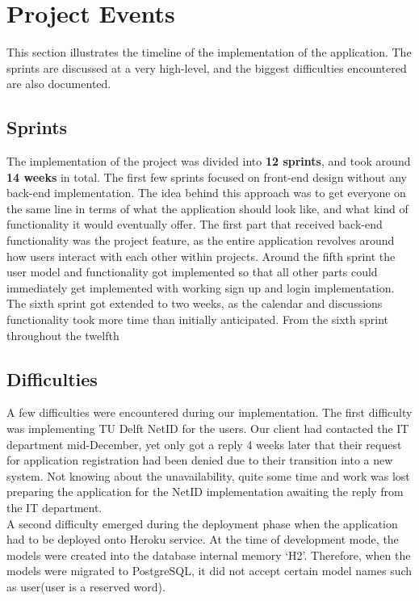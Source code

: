 \section{Project Events}

This section illustrates the timeline of the implementation of the application. The sprints are discussed at a very high-level, and
the biggest difficulties encountered are also documented.

\subsection{Sprints}

The implementation of the project was divided into \textbf{12 sprints}, and took around \textbf{14 weeks} in total. 
The first few sprints focused on front-end design without any back-end implementation. The idea
behind this approach was to get everyone on the same line in terms of what the application should look like, and
what kind of functionality it would eventually offer. 
The first part that received back-end functionality was the project feature, as the entire application
revolves around how users interact with each other within projects.
Around the fifth sprint the user model and functionality got implemented so that all other parts could immediately
get implemented with working sign up and login implementation.
The sixth sprint got extended to two weeks, as the calendar and discussions functionality took more time than initially
anticipated. From the sixth sprint throughout the twelfth
\newpage
\subsection{Difficulties}

A few difficulties were encountered during our implementation. The first difficulty was implementing TU Delft
NetID for the users. Our client had contacted the IT department mid-December, yet only got a reply 4 weeks later
that their request for application registration had been denied due to their transition into a new system. Not
knowing about the unavailability, quite some time and work was lost preparing the application for the NetID implementation
awaiting the reply from the IT department.\\

A second difficulty emerged during the deployment phase when the application had to be deployed onto Heroku service. At the time of development mode, the models were created into the database internal memory `H2'. Therefore, when the models were migrated to PostgreSQL, it did not accept certain model names such as user(user is a reserved word).